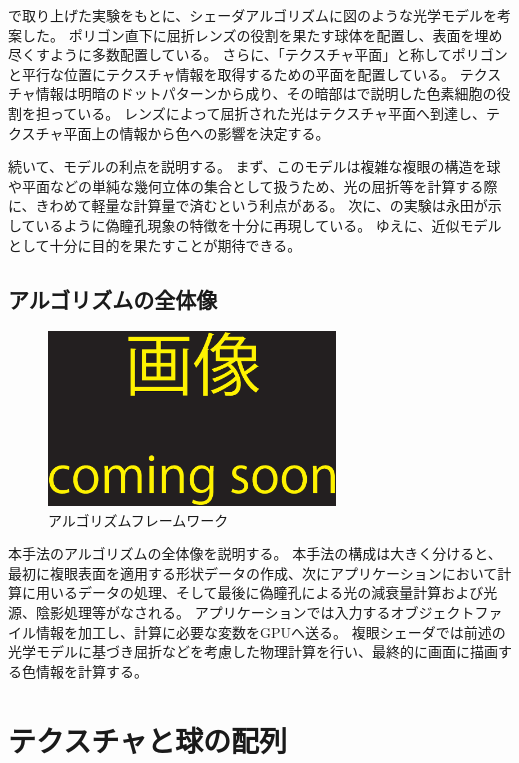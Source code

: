 で取り上げた実験をもとに、シェーダアルゴリズムに図のような光学モデルを考案した。
ポリゴン直下に屈折レンズの役割を果たす球体を配置し、表面を埋め尽くすように多数配置している。
さらに、「テクスチャ平面」と称してポリゴンと平行な位置にテクスチャ情報を取得するための平面を配置している。
テクスチャ情報は明暗のドットパターンから成り、その暗部はで説明した色素細胞の役割を担っている。
レンズによって屈折された光はテクスチャ平面へ到達し、テクスチャ平面上の情報から色への影響を決定する。

続いて、モデルの利点を説明する。
まず、このモデルは複雑な複眼の構造を球や平面などの単純な幾何立体の集合として扱うため、光の屈折等を計算する際に、きわめて軽量な計算量で済むという利点がある。
次に、の実験は永田\cite{nagata-2008-03-10}が示しているように偽瞳孔現象の特徴を十分に再現している。
ゆえに、近似モデルとして十分に目的を果たすことが期待できる。


\subsection{アルゴリズムの全体像}
\label{SSAlgorithm}

\begin{figure}[h]
  \centering
  \includegraphics[width=3.0in]{./img/TEMP}
  \caption{アルゴリズムフレームワーク}
  \label{FAlgoframework}
\end{figure}

本手法のアルゴリズムの全体像を説明する。
本手法の構成は大きく分けると、最初に複眼表面を適用する形状データの作成、次にアプリケーションにおいて計算に用いるデータの処理、そして最後に偽瞳孔による光の減衰量計算および光源、陰影処理等がなされる。
アプリケーションでは入力するオブジェクトファイル情報を加工し、計算に必要な変数をGPUへ送る。
複眼シェーダでは前述の光学モデルに基づき屈折などを考慮した物理計算を行い、最終的に画面に描画する色情報を計算する。

\section{テクスチャと球の配列}
\label{STextureandsphere}

